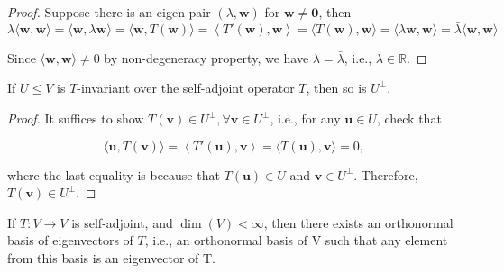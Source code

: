\begin{proof}
Suppose there is an eigen-pair \(\left( {\lambda ,\mathbf{w}}\right)\) for \(\mathbf{w} \neq  \mathbf{0}\), then
\[
\lambda \langle \mathbf{w},\mathbf{w}\rangle  = \langle \mathbf{w},\lambda \mathbf{w}\rangle
= \langle \mathbf{w},T\left( \mathbf{w}\right) \rangle  = \left\langle  {T'\left( \mathbf{w}\right) ,\mathbf{w}}\right\rangle
= \langle T\left( \mathbf{w}\right) ,\mathbf{w}\rangle  = \langle \lambda \mathbf{w},\mathbf{w}\rangle
= \bar{\lambda }\langle \mathbf{w},\mathbf{w}\rangle
\]

Since \(\langle \mathbf{w},\mathbf{w}\rangle  \neq  0\) by non-degeneracy property, we have \(\lambda  = \bar{\lambda }\), i.e., \(\lambda  \in  \mathbb{R}\).
\end{proof}

\begin{proposition}\label{prop:self-adjoint-orthogonal-space}
If \(U \leq V\) is \(T\)-invariant over the self-adjoint operator \(T\), then so is \(U^\perp\).
\end{proposition}

\begin{proof}
It suffices to show \(T\left( \mathbf{v}\right)  \in  {U}^{ \bot  },\forall \mathbf{v} \in  {U}^{ \bot  }\), i.e., for any \(\mathbf{u} \in  U\), check that

\[
\langle \mathbf{u},T\left( \mathbf{v}\right) \rangle  = \left\langle  {T'\left( \mathbf{u}\right) ,\mathbf{v}}\right\rangle   = \langle T\left( \mathbf{u}\right) ,\mathbf{v}\rangle  = 0,
\]

where the last equality is because that \(T\left( \mathbf{u}\right)  \in  U\) and \(\mathbf{v} \in  {U}^{ \bot  }\). Therefore, \(T\left( \mathbf{v}\right)  \in  {U}^{ \bot  }\).
\end{proof}

\begin{theorem}\label{thm: spectral-self-aadjoint}
If \(T : V \rightarrow V\) is self-adjoint, and \(\dim(V) < \infty\), then there exists an orthonormal basis of eigenvectors of \(T\), i.e., an orthonormal basis of V such that any element from this
basis is an eigenvector of T.
\end{theorem}

